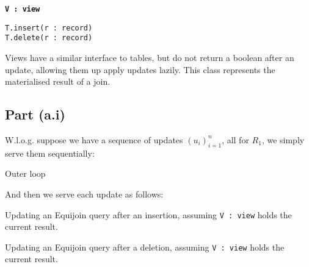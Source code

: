 \begin{marginfigure}
  \textbf{\texttt{V\,:\,view}}
  \begin{description}
    \item[\texttt{T.insert(r\,:\,record)}]
    \item[\texttt{T.delete(r\,:\,record)}]
  \end{description}
  \caption{Views have a similar interface to tables, but do not return a boolean after an update, allowing them up apply updates lazily. This class represents the materialised result of a join.}\label{iface:view}
\end{marginfigure}

\subsection{Part (a.i)}\label{sec:q-1-a-i}

W.l.o.g. suppose we have a sequence of updates $(u_i)_{i=1}^n$, all for $R_1$, we simply serve them sequentially:

\begin{algorithm}
  \caption{Outer loop}
\end{algorithm}

And then we serve each update as follows:

\begin{algorithm}

  \caption{Updating an Equijoin query after an insertion, assuming \texttt{V\,:\,view} holds the current result.}\label{alg:up-join-insert}
\end{algorithm}
\begin{algorithm}
  \caption{Updating an Equijoin query after a deletion, assuming \texttt{V\,:\,view} holds the current result.}\label{alg:up-join-delete}
\end{algorithm}

